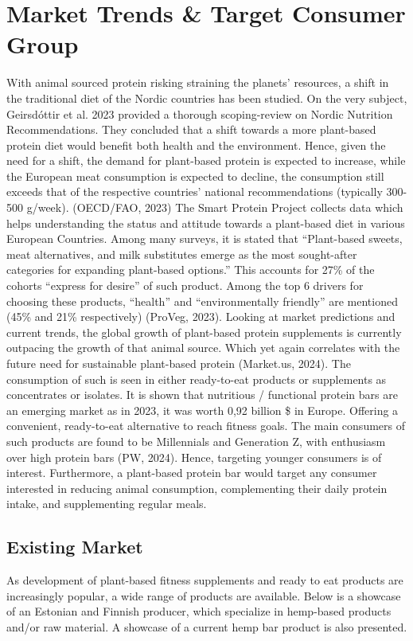 \section{Market Trends \& Target Consumer Group}
With animal sourced protein risking straining the planets' resources, a shift in the traditional diet of the Nordic countries has been studied. On the very subject, Geirsdóttir et al. 2023 provided a thorough scoping-review on Nordic Nutrition Recommendations. They concluded that a shift towards a more plant-based protein diet would benefit both health and the environment. Hence, given the need for a shift, the demand for plant-based protein is expected to increase, while the European meat consumption is expected to decline, the consumption still exceeds that of the respective countries' national recommendations (typically 300-500 g/week). (OECD/FAO, 2023) The Smart Protein Project collects data which helps understanding the status and attitude towards a plant-based diet in various European Countries. Among many surveys, it is stated that “Plant-based sweets, meat alternatives, and milk substitutes emerge as the most sought-after categories for expanding plant-based options.” This accounts for 27\% of the cohorts “express for desire” of such product. Among the top 6 drivers for choosing these products, “health” and “environmentally friendly” are mentioned (45\% and 21\% respectively) (ProVeg, 2023). 
Looking at market predictions and current trends, the global growth of plant-based protein supplements is currently outpacing the growth of that animal source. Which yet again correlates with the future need for sustainable plant-based protein (Market.us, 2024). The consumption of such is seen in either ready-to-eat products or supplements as concentrates or isolates. It is shown that nutritious / functional protein bars are an emerging market as in 2023, it was worth 0,92 billion \$ in Europe. Offering a convenient, ready-to-eat alternative to reach fitness goals. The main consumers of such products are found to be Millennials and Generation Z, with enthusiasm over high protein bars (PW, 2024). Hence, targeting younger consumers is of interest. Furthermore, a plant-based protein bar would target any consumer interested in reducing animal consumption, complementing their daily protein intake, and supplementing regular meals.

\subsection{Existing Market}
As development of plant-based fitness supplements and ready to eat products are increasingly popular, a wide range of products are available. Below is a showcase of an Estonian and Finnish producer, which specialize in hemp-based products and/or raw material. A showcase of a current hemp bar product is also presented.

